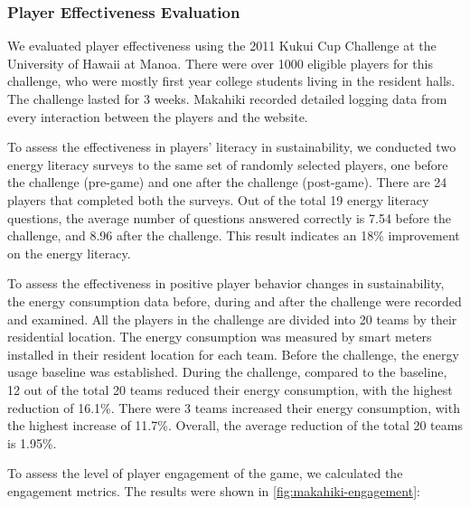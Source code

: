 \documentclass{sigchi}
\begin{document}
\subsubsection{Player Effectiveness Evaluation}

We evaluated player effectiveness using the 2011 Kukui Cup Challenge at
the University of Hawaii at Manoa. There were over 1000 eligible players
for this challenge, who were mostly first year college students living
in the resident halls. The challenge lasted for 3 weeks.
Makahiki recorded detailed logging data from every interaction between the
players and the website.

To assess the effectiveness in players' literacy in sustainability, we conducted
two energy literacy surveys to the same set of randomly selected players, one before the challenge (pre-game) and one after the challenge (post-game). There are 24 players that completed both the surveys. Out of the total 19 energy literacy questions, the average number of questions answered correctly is 7.54 before the challenge, and 8.96 after the challenge. This result indicates an 18\% improvement on the energy literacy.

To assess the effectiveness in positive player behavior changes in sustainability, the
energy consumption data before, during and after the challenge were
recorded and examined. All the players in the challenge are divided into 20 teams by their residential location. The energy consumption was measured by smart meters installed
in their resident location for each team. Before the challenge, the energy usage baseline was established. During the challenge, compared to the baseline, 12 out of the total 20 teams reduced their energy consumption, with the highest reduction of 16.1\%. There were 3 teams increased their energy consumption, with the highest increase of 11.7\%. Overall, the average reduction of the total 20 teams is 1.95\%.

To assess the level of player engagement of the game, we calculated the engagement
metrics. The results were shown in \autoref{fig:makahiki-engagement}:
\end{document}
